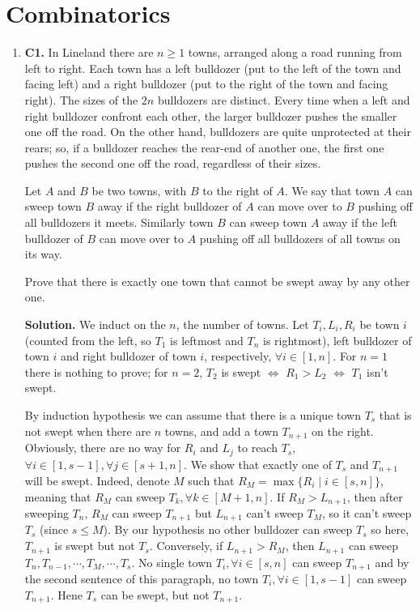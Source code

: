 \documentclass[11pt,a4paper]{article}
\begin{document}
\section{Combinatorics}
\begin{enumerate}
\item\textbf{C1.} In Lineland there are $n\geq1$ towns, arranged along a road running from left to right. Each town has a left bulldozer (put to the left of the town and facing left) and a right bulldozer (put to the right of the town and facing right). The sizes of the $2n$ bulldozers are distinct. Every time when a left and right bulldozer confront each other, the larger bulldozer pushes the smaller one off the road. On the other hand, bulldozers are quite unprotected at their rears; so, if a bulldozer reaches the rear-end of another one, the first one pushes the second one off the road, regardless of their sizes.

Let $A$ and $B$ be two towns, with $B$ to the right of $A$. We say that town $A$ can sweep town $B$ away if the right bulldozer of $A$ can move over to $B$ pushing off all bulldozers it meets. Similarly town $B$ can sweep town $A$ away if the left bulldozer of $B$ can move over to $A$ pushing off all bulldozers of all towns on its way.

Prove that there is exactly one town that cannot be swept away by any other one.

\textbf{Solution.} We induct on the $n$, the number of towns. Let $T_i, L_i, R_i$ be town $i$ (counted from the left, so $T_1$ is leftmost and $T_n$ is rightmost), left bulldozer of town $i$ and right bulldozer of town $i$, respectively, $\forall i\in[1,n]$. For $n=1$ there is nothing to prove; for $n=2$, $T_2$ is swept $\Leftrightarrow$ $R_1>L_2$ $\Leftrightarrow$ $T_1$ isn't swept.

By induction hypothesis we can assume that there is a unique town $T_s$ that is not swept when there are $n$ towns, and add a town $T_{n+1}$ on the right. Obviously, there are no way for $R_i$ and $L_j$ to reach $T_s$, $\forall i\in[1,s-1], \forall j\in [s+1, n]$. We show that exactly one of $T_s$ and $T_{n+1}$ will be swept. Indeed, denote $M$ such that $R_M=\max \{R_i\mid i\in [s, n]\}$, meaning that $R_M$ can sweep $T_k, \forall k\in[M+1, n]$. If $R_M>L_{n+1}$, then after sweeping $T_n$, $R_M$ can sweep $T_{n+1}$ but $L_{n+1}$ can't sweep $T_M$, so it can't sweep $T_s$ (since $s\le M$). By our hypothesis no other bulldozer can sweep $T_s$ so here, $T_{n+1}$ is swept but not $T_s$. Conversely, if $L_{n+1}>R_M$, then $L_{n+1}$ can sweep $T_n, T_{n-1},\cdots , T_{M},\cdots , T_{s}$. No single town $T_{i}, \forall i\in [s,n]$ can sweep $T_{n+1}$ and by the second sentence of this paragraph, no town $T_i, \forall i\in [1, s-1]$ can sweep $T_{n+1}$. Hene $T_{s}$ can be swept, but not $T_{n+1}$.


\end{enumerate}
\end{document}
